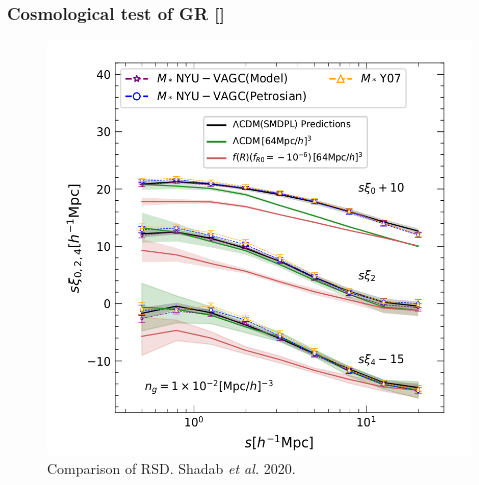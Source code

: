 \documentclass{beamer}
\makeatletter
\newcommand{\mylabel}{%
   [\beamer@againname]}
\makeatother
\begin{document}
\begin{frame}[plain,label=grcosmology]
    \frametitle{Cosmological test of GR\mylabel}
    \begin{figure}
        \includegraphics[height=.8\textheight]{images/alam-rsd.png}
        \caption{Comparison of RSD. Shadab \emph{et al.} 2020.}
    \end{figure}
\end{frame}
\end{document}
